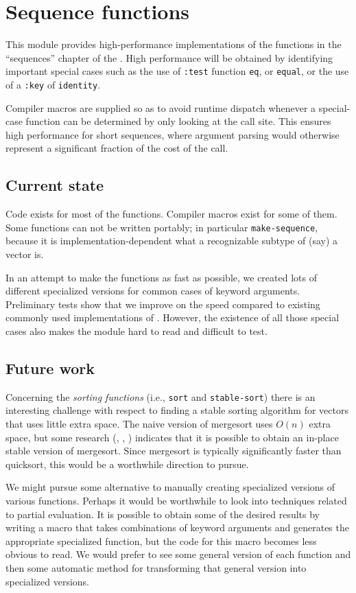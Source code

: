 \chapter{Sequence functions}

This module provides high-performance implementations of the
functions in the ``sequences'' chapter of the \hs{}.  High
performance will be obtained by identifying important special cases
such as the use of \texttt{:test} function \texttt{eq}, or
\texttt{equal}, or the use of a \texttt{:key} of \texttt{identity}. 

Compiler macros are supplied so as to avoid runtime dispatch
whenever a special-case function can be determined by only looking at
the call site.  This ensures high performance for short sequences,
where argument parsing would otherwise represent a significant
fraction of the cost of the call.

\section{Current state}

Code exists for most of the functions.  Compiler macros exist for some
of them.  Some functions can not be written portably; in particular
\texttt{make-sequence}, because it is implementation-dependent what a
recognizable subtype of (say) a vector is.

In an attempt to make the functions as fast as possible, we created
lots of different specialized versions for common cases of keyword
arguments.  Preliminary tests show that we improve on the speed
compared to existing commonly used implementations of \commonlisp{}.  However,
the existence of all those special cases also makes the module hard to
read and difficult to test.  

\section{Future work}

Concerning the \emph{sorting functions} (i.e., \texttt{sort} and
\texttt{stable-sort}) there is an interesting challenge with respect
to finding a stable sorting algorithm for vectors that uses little
extra space.  The naive version of mergesort uses $O(n)$ extra space,
but some research (\cite{Huang:1990:FSM:898863},
\cite{Huang:1988:PIM:42392.42403},
\cite{Katajainen:1996:PIM:642136.642138}) indicates that it is
possible to obtain an in-place stable version of mergesort.   Since
mergesort is typically significantly faster than quicksort, this would
be a worthwhile direction to pursue.

We might pursue some alternative to manually creating specialized
versions of various functions.  Perhaps it would be worthwhile to look
into techniques related to partial evaluation.  It is possible to
obtain some of the desired results by writing a macro that takes
combinations of keyword arguments and generates the appropriate
specialized function, but the code for this macro becomes less obvious
to read.  We would prefer to see some general version of each function
and then some automatic method for transforming that general version
into specialized versions.  


